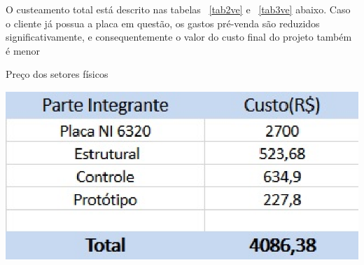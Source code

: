 O custeamento total está descrito nas tabelas ~\ref{tab2ve} e ~\ref{tab3ve} abaixo. Caso o cliente já possua a placa em questão, os gastos pré-venda são reduzidos significativamente, e consequentemente o valor do custo final do projeto também é menor\\ 
\begin{table}[!htb]
	\centering
	\caption{Preço dos setores físicos}\label{tab2ve}
	\includegraphics[scale=1]{figuras/figura2ve.eps}
\end{table}
